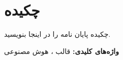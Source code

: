 
\thispagestyle{plain}

{}

\section*{چکیده}
چکیده پایان نامه را در اینجا بنویسید.


\vskip 2cm
\noindent
\textbf{واژه‌های کلیدی:} 
قالب ، هوش مصنوعی
